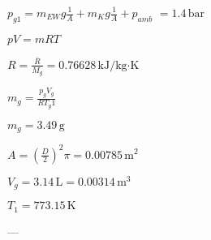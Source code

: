\( p_{g1} = m_{EW} g \frac{1}{A} + m_K g \frac{1}{A} + p_{amb} \)  
\( = 1.4 \, \text{bar} \)  

\( pV = mRT \)  

\( R = \frac{\bar{R}}{M_g} = 0.76628 \, \text{kJ/kg·K} \)  

\( m_g = \frac{p_g V_g}{R T_g1} \)  

\( m_g = 3.49 \, \text{g} \)  

\( A = (\frac{D}{2})^2 \pi = 0.00785 \, \text{m}^2 \)  

\( V_g = 3.14 \, \text{L} = 0.00314 \, \text{m}^3 \)  

\( T_1 = 773.15 \, \text{K} \)  

---